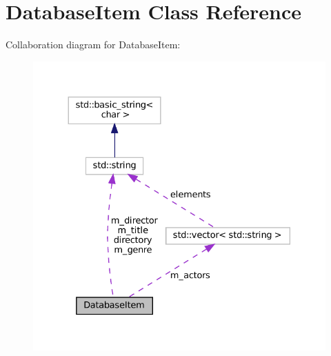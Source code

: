 \hypertarget{classDatabaseItem}{}\section{Database\+Item Class Reference}
\label{classDatabaseItem}


Collaboration diagram for Database\+Item\+:
\nopagebreak
\begin{figure}[H]
\begin{center}
\leavevmode
\includegraphics[width=330pt]{classDatabaseItem__coll__graph}
\end{center}
\end{figure}
